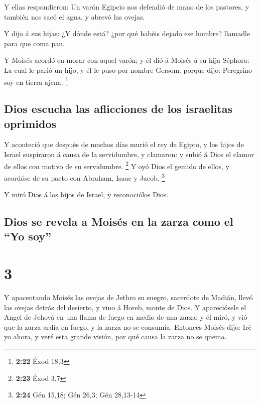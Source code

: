  Y ellas respondieron: Un varón Egipcio nos defendió de
mano de los pastores, y también nos sacó el agua, y abrevó las ovejas.

 Y dijo á sus hijas: ¿Y dónde está? ¿por qué habéis dejado
ese hombre? llamadle para que coma pan.

 Y Moisés acordó en morar con aquel varón; y él dió á
Moisés á su hija Séphora:  La cual le parió un hijo, y él
le puso por nombre Gersom: porque dijo: Peregrino soy en tierra ajena.
\footnote{\textbf{2:22} Éxod 18,3}

\hypertarget{dios-escucha-las-aflicciones-de-los-israelitas-oprimidos}{%
\subsection{Dios escucha las aflicciones de los israelitas
oprimidos}\label{dios-escucha-las-aflicciones-de-los-israelitas-oprimidos}}

 Y aconteció que después de muchos días murió el rey de
Egipto, y los hijos de Israel suspiraron á causa de la servidumbre, y
clamaron: y subió á Dios el clamor de ellos con motivo de su
servidumbre. \footnote{\textbf{2:23} Éxod 3,7}  Y oyó Dios
el gemido de ellos, y acordóse de su pacto con Abraham, Isaac y Jacob.
\footnote{\textbf{2:24} Gén 15,18; Gén 26,3; Gén 28,13-14}

 Y miró Dios á los hijos de Israel, y reconociólos Dios.

\hypertarget{dios-se-revela-a-moisuxe9s-en-la-zarza-como-el-yo-soy}{%
\subsection{Dios se revela a Moisés en la zarza como el ``Yo
soy''}\label{dios-se-revela-a-moisuxe9s-en-la-zarza-como-el-yo-soy}}

\hypertarget{section-2}{%
\section{3}\label{section-2}}

 Y apacentando Moisés las ovejas de Jethro su suegro,
sacerdote de Madián, llevó las ovejas detrás del desierto, y vino á
Horeb, monte de Dios.  Y apareciósele el Angel de Jehová en
una llama de fuego en medio de una zarza: y él miró, y vió que la zarza
ardía en fuego, y la zarza no se consumía.  Entonces Moisés
dijo: Iré yo ahora, y veré esta grande visión, por qué causa la zarza no
se quema.

